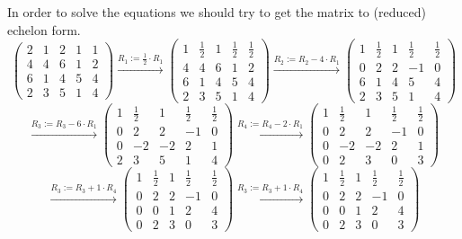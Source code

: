 \documentclass[a4paper]{article}
\begin{document}
In order to solve the equations we should try to get the matrix to (reduced) echelon form.
\[
\left(
\begin{array}{cccc|c}
2 & 1 & 2 & 1 & 1  \\
4 & 4 & 6 & 1 & 2  \\
6 & 1 & 4 & 5 & 4  \\
2 & 3 & 5 & 1 & 4
\end{array}
\right)
\xrightarrow{\text{$R_1 := \frac{1}{2} \cdot R_1$}}
\left(
\begin{array}{cccc|c}
1 & \frac{1}{2} & 1 & \frac{1}{2} & \frac{1}{2}  \\
4 & 4 & 6 & 1 & 2  \\
6 & 1 & 4 & 5 & 4  \\
2 & 3 & 5 & 1 & 4
\end{array}
\right)
\xrightarrow{\text{$R_2 := R_2 - 4 \cdot R_1$}}
\left(
\begin{array}{cccc|c}
1 & \frac{1}{2} & 1 & \frac{1}{2} & \frac{1}{2}  \\
0 & 2 & 2 & -1 & 0  \\
6 & 1 & 4 & 5 & 4  \\
2 & 3 & 5 & 1 & 4
\end{array}
\right)
\]
\[
\xrightarrow{\text{$R_3 := R_3 - 6 \cdot R_1$}}
\left(
\begin{array}{cccc|c}
1 & \frac{1}{2} & 1 & \frac{1}{2} & \frac{1}{2}  \\
0 & 2 & 2 & -1 & 0  \\
0 & -2 & -2 & 2 & 1  \\
2 & 3 & 5 & 1 & 4
\end{array}
\right)
\xrightarrow{\text{$R_4 := R_4 - 2 \cdot R_1$}}
\left(
\begin{array}{cccc|c}
1 & \frac{1}{2} & 1 & \frac{1}{2} & \frac{1}{2}  \\
0 & 2 & 2 & -1 & 0  \\
0 & -2 & -2 & 2 & 1  \\
0 & 2 & 3 & 0 & 3
\end{array}
\right)
\]
\[
\xrightarrow{\text{$R_3 := R_3 + 1 \cdot R_4$}}
\left(
\begin{array}{cccc|c}
1 & \frac{1}{2} & 1 & \frac{1}{2} & \frac{1}{2}  \\
0 & 2 & 2 & -1 & 0  \\
0 & 0 & 1 & 2 & 4  \\
0 & 2 & 3 & 0 & 3
\end{array}
\right)
\xrightarrow{\text{$R_3 := R_3 + 1 \cdot R_4$}}
\left(
\begin{array}{cccc|c}
1 & \frac{1}{2} & 1 & \frac{1}{2} & \frac{1}{2}  \\
0 & 2 & 2 & -1 & 0  \\
0 & 0 & 1 & 2 & 4  \\
0 & 2 & 3 & 0 & 3
\end{array}
\right)
\]
\end{document}
